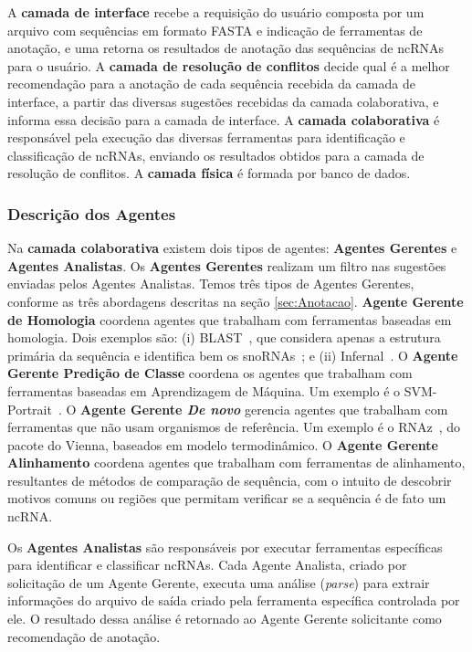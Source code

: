 A \textbf{camada de interface} recebe a requisi\c{c}\~ao do usu\'ario composta por um arquivo com sequ\^encias em formato FASTA e indica\c{c}\~ao de ferramentas de anota\c{c}\~ao, e uma retorna os resultados de anota\c{c}\~ao das sequ\^encias de ncRNAs para o usu\'ario. A \textbf{camada de resolu\c{c}\~ao de conflitos} decide qual \'e a melhor recomenda\c{c}\~ao para a anota\c{c}\~ao de cada sequ\^encia recebida da camada de interface, a partir das diversas sugest\~oes recebidas da camada colaborativa, e informa essa decis\~ao para a camada de interface. A \textbf{camada colaborativa} \'e respons\'avel pela execu\c{c}\~ao das diversas ferramentas para identifica\c{c}\~ao e classifica\c{c}\~ao de ncRNAs, enviando os resultados obtidos para a camada de resolu\c{c}\~ao de conflitos. A \textbf{camada f\'isica} \'e formada por banco de dados.

\subsubsection{Descri\c{c}\~ao dos Agentes} \label{sec:DescriAgentes}

Na \textbf{camada colaborativa} existem dois tipos de agentes: \textbf{Agentes Gerentes} e \textbf{Agentes Analistas}. Os \textbf{Agentes Gerentes} realizam um filtro nas sugest\~oes enviadas pelos Agentes Analistas. Temos tr\^es tipos de Agentes Gerentes, conforme as tr\^es abordagens descritas na se\c{c}\~ao \ref{sec:Anotacao}. \textbf{Agente Gerente de Homologia} coordena agentes que trabalham com ferramentas baseadas em homologia. Dois exemplos s\~ao: (i) BLAST~\citep{altschul1990basic:1990}, que considera apenas a estrutura prim\'aria da sequ\^encia e identifica bem os snoRNAs~\citep{durbin1998biological:1998}; e (ii) Infernal~\citep{eddy2003infernal:2003}. O \textbf{Agente Gerente Predi\c{c}\~ao de Classe} coordena os agentes que trabalham com ferramentas baseadas em Aprendizagem de M\'aquina. Um exemplo \'e o SVM-Portrait~\citep{Arrial:2006}. O \textbf{Agente Gerente \textit{De novo}} gerencia agentes que trabalham com ferramentas que não usam organismos de refer\^encia. Um exemplo \'e o RNAz~\citep{washietl2005fast:2005}, do pacote do Vienna, baseados em modelo termodin\^amico. O \textbf{Agente Gerente Alinhamento} coordena agentes que trabalham com ferramentas de alinhamento, resultantes de métodos de comparação de sequência, com o intuito de descobrir motivos comuns ou regi\~oes que permitam verificar se a sequ\^encia \'e de fato um ncRNA.


Os \textbf{Agentes Analistas} s\~ao respons\'aveis por executar ferramentas espec\'ificas para identificar e classificar ncRNAs. Cada Agente Analista, criado por solicita\c{c}\~ao de um Agente Gerente, executa uma an\'alise (\textit{parse}) para extrair informa\c{c}\~oes do arquivo de sa\'ida criado pela ferramenta espec\'ifica controlada por ele. O resultado dessa an\'alise \'e retornado ao Agente Gerente solicitante como recomenda\c{c}\~ao de anota\c{c}\~ao.



